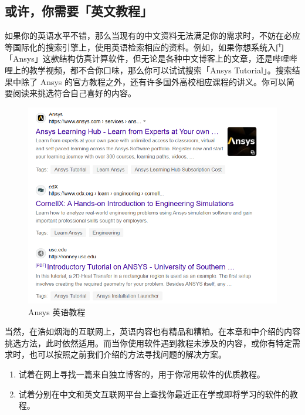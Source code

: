 \subsection{或许，你需要「英文教程」}

如果你的英语水平不错，那么当现有的中文资料无法满足你的需求时，不妨在必应等国际化的搜索引擎上，使用英语检索相应的资料。例如，如果你想系统入门「Ansys」这款结构仿真计算软件，但无论是各种中文博客上的文章，还是哔哩哔哩上的教学视频，都不合你口味，那么你可以试试搜索「Ansys Tutorial」。搜索结果中除了 Ansys 的官方教程之外，还有许多国外高校相应课程的讲义。你可以简要阅读来挑选符合自己喜好的内容。

\begin{figure}[htb!]
  \centering
  \includegraphics[width=.6\textwidth]{assets/software/Ansys.png}
  \caption{Ansys 英语教程}
  \label{fig:Ansys}
\end{figure}

当然，在浩如烟海的互联网上，英语内容也有精品和糟粕。在本章和中介绍的内容挑选方法，此时依然适用。而当你使用软件遇到教程未涉及的内容，或你有特定需求时，也可以按照之前我们介绍的方法寻找问题的解决方案。

\practice

\begin{enumerate}
  \item 试着在网上寻找一篇来自独立博客的，用于你常用软件的优质教程。
  \item 试着分别在中文和英文互联网平台上查找你最近正在学或即将学习的软件的教程。
\end{enumerate}
